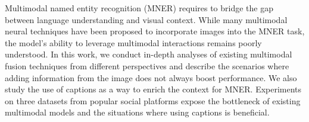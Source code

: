 Multimodal named entity recognition (MNER) requires to bridge the gap between language understanding and visual context. While many multimodal neural techniques have been proposed to incorporate images into the MNER task, the model's ability to leverage multimodal interactions remains poorly understood. In this work, we conduct in-depth analyses of existing multimodal fusion techniques from different perspectives and describe the scenarios where adding information from the image does not always boost performance. We also study the use of captions as a way to enrich the context for MNER. Experiments on three datasets from popular social platforms expose the bottleneck of existing multimodal models and the situations where using captions is beneficial.
